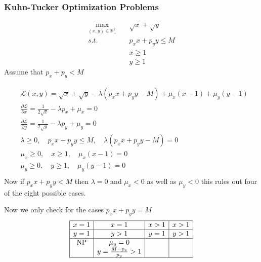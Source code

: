 \documentclass[12pt,a4paper]{article}
\begin{document}
\subsubsection{Kuhn-Tucker Optimization Problems}
\begin{tcolorbox}
    \begin{align*}
        \max_{(x,y)\in \mathbb{R}^{2}_{+}} & \quad \sqrt{x} + \sqrt{y} \\
        s.t. & \quad p_{x}x+p_{y}y \leq M\\
        & \quad x \geq 1\\
        & \quad y \geq 1
 \end{align*}
Assume that \(p_{x}+p_{y}<M \) 
\end{tcolorbox}
\begin{align*}
    &\mathcal{L}(x,y)=\sqrt{x}+\sqrt{y} - \lambda (p_{x}x+p_{y}y -M) + \mu_{x}(x-1) + \mu_{y}(y-1)\\
    &\frac{\partial \mathcal{L}}{\partial x}= \frac{1}{2\sqrt{x}} - \lambda p_{x} + \mu_{x} = 0\\
    &\frac{\partial \mathcal{L}}{\partial y}= \frac{1}{2\sqrt{y}} - \lambda p_{y} + \mu_{y} = 0\\
    &\lambda \geq 0, \quad p_{x}x+p_{y}y \leq M, \quad \lambda(p_{x}x+p_{y}y-M)=0\\
    &\mu_{x} \geq 0, \quad x \geq 1, \quad \mu_{x}(x-1)=0\\
    &\mu_{y} \geq 0, \quad y \geq 1, \quad \mu_{y}(y-1)=0\\
 \end{align*}
 Now if \(p_{x}x+p_{y}y <M\) then \(\lambda =0\) and \(\mu_{x}<0\) as well as \(\mu_{y}<0\) this rules out four of the eight possible cases.
 
 Now we only check for the cases \(p_{x}x+p_{y}y=M\)
 \begin{align*}
        \begin{array}{|c|c|c|c|}
           \hline x=1 & x=1 & x>1 & x>1\\
           \hline y=1 & y>1 & y=1 & y>1\\
           \hline \text{NP} & \mu_{y}=0 & & \\
           & y=\frac{M-p_{x}}{p_{y}}>1& &\\
           \hline
        \end{array}
\end{align*} 
\end{document}
